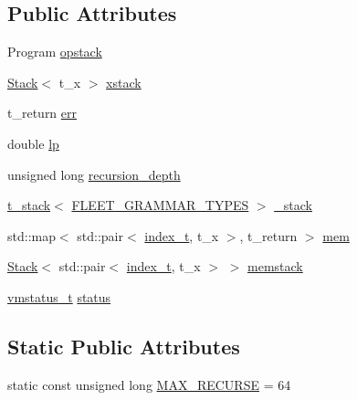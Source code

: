 \subsection*{Public Attributes}
\begin{DoxyCompactItemize}
\item 
Program \hyperlink{class_virtual_machine_state_a37b2fdff8af77aea5b45afb6644099b0}{opstack}
\item 
\hyperlink{class_stack}{Stack}$<$ t\+\_\+x $>$ \hyperlink{class_virtual_machine_state_a83d4e418eee2f9208641bb12c99bd7fb}{xstack}
\item 
t\+\_\+return \hyperlink{class_virtual_machine_state_aca5b21a6e1babe0d57086ae49ebf6c7d}{err}
\item 
double \hyperlink{class_virtual_machine_state_adce04f52049f686272022e4f1b8c0257}{lp}
\item 
unsigned long \hyperlink{class_virtual_machine_state_a9d28667bb71e7a7aad5dabdc41dd55d0}{recursion\+\_\+depth}
\item 
\hyperlink{struct_virtual_machine_state_1_1t__stack}{t\+\_\+stack}$<$ \hyperlink{_rational_rules_2_main_8cpp_a89fb8e7826ca09e23da0ce4b39ee03c0}{F\+L\+E\+E\+T\+\_\+\+G\+R\+A\+M\+M\+A\+R\+\_\+\+T\+Y\+P\+ES} $>$ \hyperlink{class_virtual_machine_state_a6a5b8666e3c3a5d8b951abd6ba876c39}{\+\_\+stack}
\item 
std\+::map$<$ std\+::pair$<$ \hyperlink{class_virtual_machine_state_ad082a1996e3cce1eb04bc788c24a3214}{index\+\_\+t}, t\+\_\+x $>$, t\+\_\+return $>$ \hyperlink{class_virtual_machine_state_a73a2f267d4140241389b1fcab4a981b0}{mem}
\item 
\hyperlink{class_stack}{Stack}$<$ std\+::pair$<$ \hyperlink{class_virtual_machine_state_ad082a1996e3cce1eb04bc788c24a3214}{index\+\_\+t}, t\+\_\+x $>$ $>$ \hyperlink{class_virtual_machine_state_ac7c71aba54fb5fce40ee1854cb5204b6}{memstack}
\item 
\hyperlink{_instruction_8h_a6202215407ab29590bb936ca2996cf64}{vmstatus\+\_\+t} \hyperlink{class_virtual_machine_state_aa78c1891f8a2a656a0b60cd8a698b41d}{status}
\end{DoxyCompactItemize}
\subsection*{Static Public Attributes}
\begin{DoxyCompactItemize}
\item 
static const unsigned long \hyperlink{class_virtual_machine_state_a61a1809d19f878d8de34198d0b7671b2}{M\+A\+X\+\_\+\+R\+E\+C\+U\+R\+SE} = 64
\end{DoxyCompactItemize}


